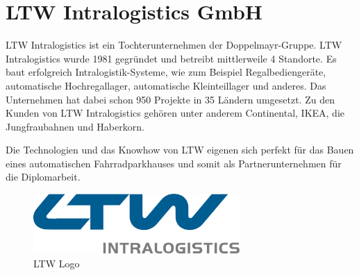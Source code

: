 \section{LTW Intralogistics GmbH}
LTW Intralogistics ist ein Tochterunternehmen der Doppelmayr-Gruppe. LTW Intralogistics wurde 1981 gegründet und betreibt mittlerweile 4 Standorte. Es baut erfolgreich Intralogistik-Systeme, wie zum Beispiel Regalbediengeräte, automatische Hochregallager, automatische Kleinteillager und anderes. Das Unternehmen hat dabei schon 950 Projekte in 35 Ländern umgesetzt. Zu den Kunden von LTW Intralogistics gehören unter anderem Continental, IKEA, die Jungfraubahnen und Haberkorn. 

\bigskip

\noindent Die Technologien und das Knowhow von LTW eigenen sich perfekt für das Bauen eines automatischen Fahrradparkhauses und somit als Partnerunternehmen für die Diplomarbeit.

\bigskip

\begin{figure}[H]
    \centering
    \includegraphics[width=0.7\textwidth]{images/ltwlogo.png}
    \caption{LTW Logo }
    \label{fig:ltwlogo}
\end{figure}